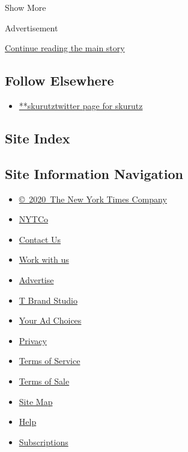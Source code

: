 Show More

Advertisement

\protect\hyperlink{after-mid2}{Continue reading the main story}

\hypertarget{follow-elsewhere}{%
\subsection{Follow Elsewhere}\label{follow-elsewhere}}

\begin{itemize}
\tightlist
\item
  \href{https://twitter.com/skurutz}{**skurutztwitter page for skurutz}
\end{itemize}

\hypertarget{site-index}{%
\subsection{Site Index}\label{site-index}}

\hypertarget{site-information-navigation}{%
\subsection{Site Information
Navigation}\label{site-information-navigation}}

\begin{itemize}
\tightlist
\item
  \href{https://help.nytimes.com/hc/en-us/articles/115014792127-Copyright-notice}{©~2020~The
  New York Times Company}
\end{itemize}

\begin{itemize}
\tightlist
\item
  \href{https://www.nytco.com/}{NYTCo}
\item
  \href{https://help.nytimes.com/hc/en-us/articles/115015385887-Contact-Us}{Contact
  Us}
\item
  \href{https://www.nytco.com/careers/}{Work with us}
\item
  \href{https://nytmediakit.com/}{Advertise}
\item
  \href{http://www.tbrandstudio.com/}{T Brand Studio}
\item
  \href{https://www.nytimes.com/privacy/cookie-policy\#how-do-i-manage-trackers}{Your
  Ad Choices}
\item
  \href{https://www.nytimes.com/privacy}{Privacy}
\item
  \href{https://help.nytimes.com/hc/en-us/articles/115014893428-Terms-of-service}{Terms
  of Service}
\item
  \href{https://help.nytimes.com/hc/en-us/articles/115014893968-Terms-of-sale}{Terms
  of Sale}
\item
  \href{https://spiderbites.nytimes.com}{Site Map}
\item
  \href{https://help.nytimes.com/hc/en-us}{Help}
\item
  \href{https://www.nytimes.com/subscription?campaignId=37WXW}{Subscriptions}
\end{itemize}
